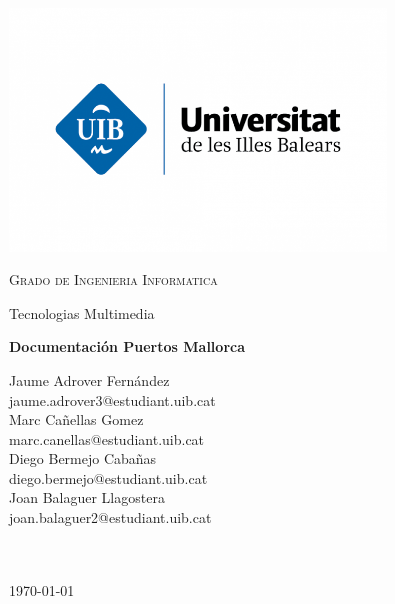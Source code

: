 \documentclass{article}
\begin{document}
\begin{titlepage}
    \centering
    \includegraphics[width=0.75\textwidth]{images/uib.png}\par\vspace{1cm}
    {\scshape\LARGE Grado de Ingenieria Informatica \par}
    \vspace{1cm}
    {\Large Tecnologias Multimedia \par}
    \vspace{1.5cm}
    {\huge\bfseries Documentación Puertos Mallorca\par}
    \vspace{2cm}
    {\large
    Jaume Adrover Fernández \\
    jaume.adrover3@estudiant.uib.cat \\
    \vspace{0.5cm}
    Marc Cañellas Gomez \\
    marc.canellas@estudiant.uib.cat \\
    \vspace{0.5cm}
    Diego Bermejo Cabañas \\
    diego.bermejo@estudiant.uib.cat \\
    \vspace{0.5cm}
    Joan Balaguer Llagostera \\
    joan.balaguer2@estudiant.uib.cat \\
    \textit{}\\
    \texttt{}
    \par}
    \vfill

    {\large \texttt{} \\\today\par}
\end{titlepage}

\newpage
\hypersetup{linkcolor=black}
\tableofcontents
\newpage
\end{document}
